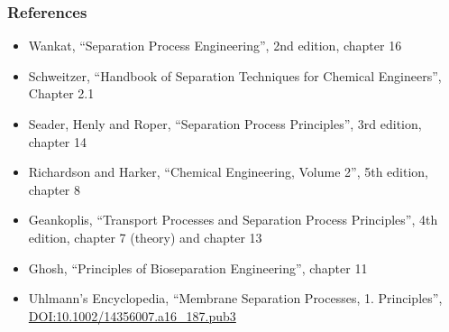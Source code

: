 \begin{frame}\frametitle{References}
	\begin{itemize}
		\item	Wankat, ``Separation Process Engineering'', 2nd edition, chapter 16
		\item	Schweitzer, ``Handbook of Separation Techniques for Chemical Engineers'', Chapter 2.1
		\item	Seader, Henly and Roper, ``Separation Process Principles'', 3rd edition, chapter 14
		\item	Richardson and Harker, ``Chemical Engineering, Volume 2'', 5th edition, chapter 8
		\item	Geankoplis, ``Transport Processes and Separation Process Principles'', 4th edition, chapter 7 (theory) and chapter 13
		\item	Ghosh, ``Principles of Bioseparation Engineering'', chapter 11 
		\item	Uhlmann's Encyclopedia, ``Membrane Separation Processes, 1. Principles'',  \href{http://dx.doi.org/10.1002/14356007.a16_187.pub3}{DOI:10.1002/14356007.a16\_187.pub3}
	\end{itemize}
\end{frame}


